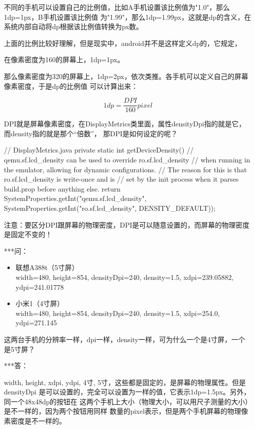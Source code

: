 \documentclass[a4paper,11pt]{article}
\begin{document}
不同的手机可以设置自己的比例值，比如A手机设置该比例值为"1.0"，那么1dp=1px，B手机设置该比例值
为"1.99"，那么1dp=1.99px，这就是dp的含义，在系统内部自动将dp根据该比例值转换为px数。

上面的比例比较好理解，但是现实中，android并不是这样定义dp的，它规定，

\begin{center}
    在像素密度为160的屏幕上，1dp=1px。
\end{center}

那么像素密度为320的屏幕上，1dp=2px，依次类推。各手机可以定义自己的屏幕像素密度，于是dp的比例值
可以计算出来：

$$1dp=\frac{DPI}{160}pixel$$

DPI就是屏幕像素密度，在DisplayMetrics类里面，属性densityDpi指的就是它，而density指的就是那个“倍数”，
那DPI是如何设定的呢？

\begin{javacode}
    // DisplayMetrics.java
    private static int getDeviceDensity() {
        // qemu.sf.lcd_density can be used to override ro.sf.lcd_density
        // when running in the emulator, allowing for dynamic configurations.
        // The reason for this is that ro.sf.lcd_density is write-once and is
        // set by the init process when it parses build.prop before anything else.
        return SystemProperties.getInt("qemu.sf.lcd_density",
            SystemProperties.getInt("ro.sf.lcd_density", DENSITY_DEFAULT));
    }
\end{javacode}

注意：要区分DPI跟屏幕的物理密度，DPI是可以随意设置的，而屏幕的物理密度是固定不变的！

***问：
\begin{itemize}
  \item 联想A388t（5寸屏）\\
  width=480, height=854, densityDpi=240, density=1.5, xdpi=239.05882, ydpi=241.01778
  \item 小米1（4寸屏）\\
  width=480, height=854, densityDpi=240, density=1.5, xdpi=254.0, ydpi=271.145
\end{itemize}
这两台手机的分辨率一样，dpi一样，density一样，可为什么一个是4寸屏，一个是5寸屏？

***答：

width, height, xdpi, ydpi, 4寸, 5寸，这些都是固定的，是屏幕的物理属性。但是densityDpi
是可以设置的，完全可以设置为一样的值，它表示1dp=1.5px。另外，同一个48x48dp的按钮在
这两个手机上大小（物理大小，可以用尺子测量的大小）是不一样的，因为两个按钮用同样
数量的pixel表示，但是两个手机屏幕的物理像素密度是不一样的。
\end{document}
